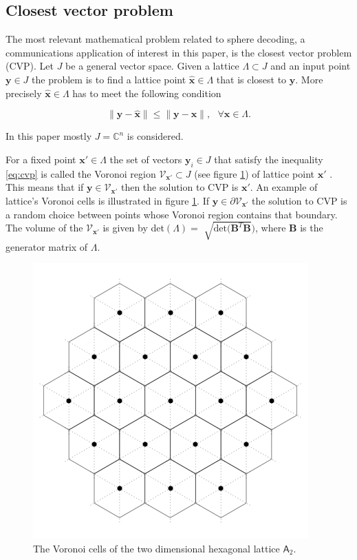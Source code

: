 \documentclass[english,12pt,a4paper,pdftex,sci,utf8]{aaltothesis}
\begin{document}
\subsection{Closest vector problem}

The most relevant mathematical problem related to sphere decoding, a communications application of interest in this paper, is the closest vector problem (CVP). Let $J$ be a general vector space. Given a lattice $\Lambda \subset J$ and an input point $\mathbf{y} \in J$ the problem is to find a lattice point $\hat{\mathbf{x}} \in \Lambda$ that is closest to $\mathbf{y}$. More precisely $\hat{\mathbf{x}} \in \Lambda$ has to meet the following condition

\begin{equation}
\|\mathbf{y}-\hat{\mathbf{x}}\| \leq \|\mathbf{y}-\mathbf{x}\|, \ \ \ \forall \mathbf{x} \in \Lambda.
\label{eq:cvp}
\end{equation}

\noindent In this paper mostly $J=\mathbb{C}^n$ is considered.
\par For a fixed point $\mathbf{x}' \in \Lambda$ the set of vectors $\mathbf{y}_i \in J$ that satisfy the inequality \eqref{eq:cvp} is called the Voronoi region $\mathcal{V}_{\mathbf{x}'} \subset J$ (see figure \ref{fig:voronoi}) of lattice point $\mathbf{x}'$ \cite{zamir}. This means that if $\mathbf{y} \in \mathcal{V}_{\mathbf{x}'}$ then the solution to CVP is $\mathbf{x}'$. An example of lattice's Voronoi cells is illustrated in figure \ref{fig:voronoi}. If $\mathbf{y} \in \partial\mathcal{V}_{\mathbf{x}'}$ the solution to CVP is a random choice between points whose Voronoi region contains that boundary. The volume of the $\mathcal{V}_{\mathbf{x}'}$
is given by det$(\Lambda) = $ $\sqrt{\text{det}(\mathbf{B}^T\mathbf{B}})$, where $\mathbf{B}$ is the generator matrix of $\Lambda$. 

\begin{figure}[ht]
  \centering
  \includegraphics[width=0.5\linewidth]{voronoi_cells}
  \caption{The Voronoi cells of the two dimensional hexagonal lattice $\mathsf{A}_2$.}
  \label{fig:voronoi}
\end{figure}
\end{document}
